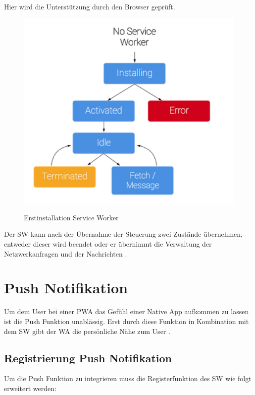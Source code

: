 Hier wird die Unterstützung durch den Browser geprüft.

\begin{figure}[h]
	\centering
	\includegraphics[width=14cm]{BilderAllgemein/InstallSW}\medskip
	\caption{Erstinstallation Service Worker}
	\label{fig:Erstinstallation}\cite{ServiceWorkerRegistration}
\end{figure}

Der \acs{SW} kann nach der Übernahme der Steuerung zwei Zustände übernehmen, entweder dieser wird beendet oder er übernimmt die Verwaltung der Netzwerkanfragen und der Nachrichten \cite{ServiceWorkerRegistration}.

\newpage

\section{Push Notifikation}
Um dem User bei einer \acs{PWA} das Gefühl einer Native App aufkommen zu lassen ist die Push Funktion unablässig. Erst durch diese Funktion in Kombination mit dem \acs{SW} gibt der \acl{WA} die persönliche Nähe zum User \cite{PushNotifikation}.


\subsection{Registrierung Push Notifikation}
Um die Push Funktion zu integrieren muss die Registerfunktion des \acs{SW} wie folgt erweitert werden:
 
